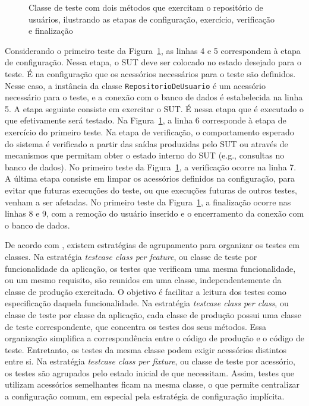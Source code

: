 \begin{figure}[htb]
	\centering
	
	\caption{Classe de teste com dois métodos que exercitam o repositório de usuários, ilustrando as etapas de configuração, exercício, verificação e finalização}
	\label{code:5-user-repository-tests}
\end{figure}

Considerando o primeiro teste da Figura~\ref{code:5-user-repository-tests}, as linhas 4 e 5 correspondem à etapa de configuração. Nessa etapa, o SUT deve ser colocado no estado desejado para o teste. É na configuração que os acessórios necessários para o teste são definidos. Nesse caso, a instância da classe \texttt{RepositorioDeUsuario} é um acessório necessário para o teste, e a conexão com o banco de dados é estabelecida na linha 5. A etapa seguinte consiste em exercitar o SUT. É nessa etapa que é executado o que efetivamente será testado. Na Figura~\ref{code:5-user-repository-tests}, a linha 6 corresponde à etapa de exercício do primeiro teste. Na etapa de verificação, o comportamento esperado do sistema é verificado a partir das saídas produzidas pelo SUT ou através de mecanismos que permitam obter o estado interno do SUT (e.g., consultas no banco de dados). No primeiro teste da Figura~\ref{code:5-user-repository-tests}, a verificação ocorre na linha 7. A última etapa consiste em limpar os acessórios definidos na configuração, para evitar que futuras execuções do teste, ou que execuções futuras de outros testes, venham a ser afetadas. No primeiro teste da Figura~\ref{code:5-user-repository-tests}, a finalização ocorre nas linhas 8 e 9, com a remoção do usuário inserido e o encerramento da conexão com o banco de dados.

De acordo com , existem estratégias de agrupamento para organizar os testes em classes. Na estratégia \textit{testcase class per feature}, ou classe de teste por funcionalidade da aplicação, os testes que verificam uma mesma funcionalidade, ou um mesmo requisito, são reunidos em uma classe, independentemente da classe de produção exercitada. O objetivo é facilitar a leitura dos testes como especificação daquela funcionalidade. Na estratégia \textit{testcase class per class}, ou classe de teste por classe da aplicação, cada classe de produção possui uma classe de teste correspondente, que concentra os testes dos seus métodos. Essa organização simplifica a correspondência entre o código de produção e o código de teste. Entretanto, os testes da mesma classe podem exigir acessórios distintos entre si. Na estratégia \textit{testcase class per fixture}, ou classe de teste por acessório, os testes são agrupados pelo estado inicial de que necessitam. Assim, testes que utilizam acessórios semelhantes ficam na mesma classe, o que permite centralizar a configuração comum, em especial pela estratégia de configuração implícita.

